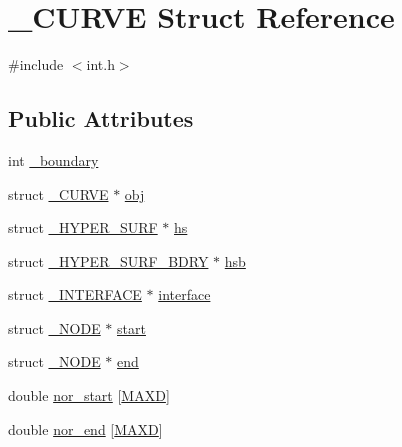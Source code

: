 \hypertarget{struct___c_u_r_v_e}{}\section{\+\_\+\+C\+U\+R\+VE Struct Reference}
\label{struct___c_u_r_v_e}


{\ttfamily \#include $<$int.\+h$>$}

\subsection*{Public Attributes}
\begin{DoxyCompactItemize}
\item 
int \hyperlink{struct___c_u_r_v_e_ae148f562d5151d59be79e846c4d9fd19}{\+\_\+boundary}
\item 
struct \hyperlink{struct___c_u_r_v_e}{\+\_\+\+C\+U\+R\+VE} $\ast$ \hyperlink{struct___c_u_r_v_e_a6855eb3d75e2608deadb9770fe8e740d}{obj}
\item 
struct \hyperlink{int_8h_dd/d7d/struct___h_y_p_e_r___s_u_r_f}{\+\_\+\+H\+Y\+P\+E\+R\+\_\+\+S\+U\+RF} $\ast$ \hyperlink{struct___c_u_r_v_e_a6d05c64d5546be6caa11f80669c6ab32}{hs}
\item 
struct \hyperlink{int_8h_d2/d15/struct___h_y_p_e_r___s_u_r_f___b_d_r_y}{\+\_\+\+H\+Y\+P\+E\+R\+\_\+\+S\+U\+R\+F\+\_\+\+B\+D\+RY} $\ast$ \hyperlink{struct___c_u_r_v_e_a6a2318e11a057535e771ff2978798eaf}{hsb}
\item 
struct \hyperlink{int_8h_d0/d95/struct___i_n_t_e_r_f_a_c_e}{\+\_\+\+I\+N\+T\+E\+R\+F\+A\+CE} $\ast$ \hyperlink{struct___c_u_r_v_e_afd756d76b762362d4bae83825898ccf7}{interface}
\item 
struct \hyperlink{struct___n_o_d_e}{\+\_\+\+N\+O\+DE} $\ast$ \hyperlink{struct___c_u_r_v_e_ae81649593e56930c639d6f4b070f2e88}{start}
\item 
struct \hyperlink{struct___n_o_d_e}{\+\_\+\+N\+O\+DE} $\ast$ \hyperlink{struct___c_u_r_v_e_a597bf2b4de813d31eb3bf3072788a476}{end}
\item 
double \hyperlink{struct___c_u_r_v_e_a92aa2f402c793e82b1f8f1275b607122}{nor\+\_\+start} \mbox{[}\hyperlink{geom_8h_aabfcbcb5ac86a1edac4035264bc7d2b8ac79558c6c6666a44ddf7e701241b8211}{M\+A\+XD}\mbox{]}
\item 
double \hyperlink{struct___c_u_r_v_e_afed0b7c349f224849682836f5d3cd0f2}{nor\+\_\+end} \mbox{[}\hyperlink{geom_8h_aabfcbcb5ac86a1edac4035264bc7d2b8ac79558c6c6666a44ddf7e701241b8211}{M\+A\+XD}\mbox{]}
\item 

\end{DoxyCompactItemize}
